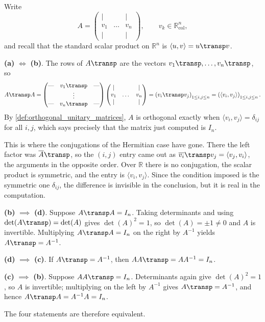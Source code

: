 \begin{exercisesolution}
\label{sol:char_orthogonal_matrices_proof}
  Write
  \[
      A = \begin{pmatrix} | & & | \\ v_1 & \dots & v_n \\ | & & | \end{pmatrix}, \qquad v_k \in \mathbb{R}^n_{\text{col}},
  \]
  and recall that the standard scalar product on $\mathbb{R}^n$ is $\langle u, v \rangle = u\transp v$.

  \textbf{(a)} $\iff$ \textbf{(b)}. The rows of $A\transp$ are the vectors $v_1\transp, \dots, v_n\transp$, so
  \[
      A\transp A = \begin{pmatrix} \text{---} & v_1\transp & \text{---} \\ & \vdots & \\ \text{---} & v_n\transp & \text{---} \end{pmatrix} \begin{pmatrix} | & & | \\ v_1 & \dots & v_n \\ | & & | \end{pmatrix} = \left( v_i\transp v_j \right)_{1 \le i, j \le n} = \left( \langle v_i, v_j \rangle \right)_{1 \le i, j \le n}.
  \]
  By \cref{def:orthogonal_unitary_matrices}, $A$ is orthogonal exactly when $\langle v_i, v_j \rangle = \delta_{ij}$ for all $i, j$, which says precisely that the matrix just computed is $I_n$.

  This is where the conjugations of the Hermitian case have gone. There the left factor was $\overline{A}\transp$, so the $(i,j)$ entry came out as $\overline{v_i}\transp v_j = \langle v_j, v_i \rangle$, the arguments in the opposite order. Over $\mathbb{R}$ there is no conjugation, the scalar product is symmetric, and the entry is $\langle v_i, v_j \rangle$. Since the condition imposed is the symmetric one $\delta_{ij}$, the difference is invisible in the conclusion, but it is real in the computation.

  \textbf{(b)} $\implies$ \textbf{(d)}. Suppose $A\transp A = I_n$. Taking determinants and using $\det(A\transp) = \det(A)$ gives $\det(A)^2 = 1$, so $\det(A) = \pm 1 \ne 0$ and $A$ is invertible. Multiplying $A\transp A = I_n$ on the right by $A^{-1}$ yields $A\transp = A^{-1}$.

  \textbf{(d)} $\implies$ \textbf{(c)}. If $A\transp = A^{-1}$, then $A A\transp = A A^{-1} = I_n$.

  \textbf{(c)} $\implies$ \textbf{(b)}. Suppose $A A\transp = I_n$. Determinants again give $\det(A)^2 = 1$, so $A$ is invertible; multiplying on the left by $A^{-1}$ gives $A\transp = A^{-1}$, and hence $A\transp A = A^{-1} A = I_n$.

  The four statements are therefore equivalent.
\end{exercisesolution}

